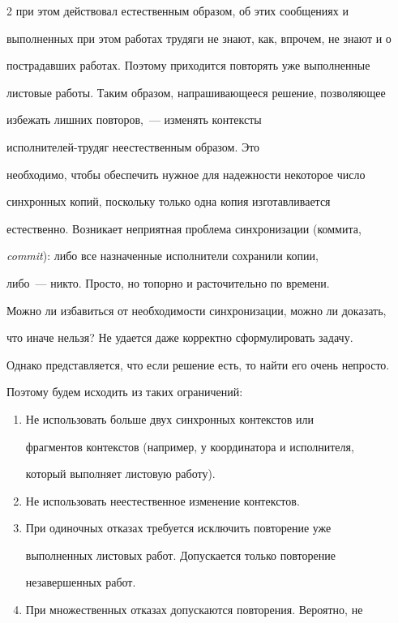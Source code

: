 \begin{multicols}{2}
при этом действовал естественным образом, об этих сообщениях и 


выполненных при этом работах трудяги не знают, как, впрочем, не знают и о 


пострадавших работах. Поэтому приходится повторять уже выполненные 


лис\-то\-вые работы. Таким образом, напрашивающееся решение, позволяющее 


избежать лишних повторов,~--- изменять контексты 


      ис\-пол\-ни\-те\-лей-тру\-дяг неестественным образом. Это 


необходимо, чтобы обеспечить нужное для надежности некоторое число 


синхронных копий, поскольку только одна копия изготавливается 


естественно. Возникает неприятная проблема синхронизации (коммита, 


\textit{commit}): либо все назначенные исполнители сохранили копии, 


      либо~--- никто. Просто, но топорно и расточительно по времени. 


Можно ли избавиться от необходимости синхронизации, можно ли доказать, 


что иначе нельзя? Не удается даже корректно сформулировать задачу. 


Однако представляется, что если решение есть, то найти его очень непросто. 


Поэтому будем исходить из таких ограничений:


      \begin{enumerate}[1.]


\item Не использовать больше двух синхронных контекстов или 


фрагментов контекстов (например, у координатора и исполнителя, 


который выполняет листовую работу).


\item Не использовать неестественное изменение контекстов.


\item При одиночных отказах требуется исключить повторение уже 


выполненных листовых работ. Допускается только повторение 


незавершенных работ.


\item При множественных отказах допускаются повторения. Вероятно, не 



\end{enumerate}
\end{multicols}
